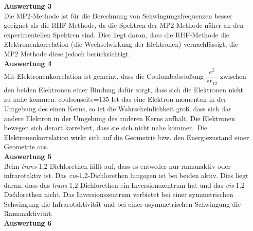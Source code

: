 \documentclass[12pt]{article}
\begin{document}
\begin{onehalfspace}
\textbf{Auswertung 3}\\
Die MP2-Methode ist für die Berechnung von Schwingungsfrequenzen besser geeignet als die RHF-Methode,
da die Spektren der MP2-Methode näher an den experimentellen Spektren sind.
Dies liegt daran, dass die RHF-Methode die Elektronenkorrelation (die Wechselwirkung der Elektronen) vernachlässigt,
die MP2 Methode diese jedoch berücksichtigt.\\
\textbf{Auswertung 4}\\
Mit Elektronenkorrelation ist gemeint, dass die Coulombabstoßung $\dfrac{e^2}{\epsilon r_{12}}$ zwischen den beiden Elektronen einer Bindung dafür sorgt, dass sich
die Elektronen nicht zu nahe kommen. coulsonseite=135 Ist das eine Elektron momentan in der Umgebung des einen Kerns,
so ist die Wahrscheinlichkeit groß, dass sich das andere Elektron in der Umgebung des anderen Kerns aufhält. Die Elektronen bewegen sich derart \glqq
korreliert\grqq, dass sie sich nicht nahe kommen. Die Elektronenkorrelation wirkt sich auf die Geometrie bzw. den
Energiezustand einer Geometrie aus.\\
\textbf{Auswertung 5}\\
Beim \textit{trans}-1,2-Dichlorethen fällt auf, dass es entweder nur ramanaktiv oder infrarotaktiv ist.
Das \textit{cis}-1,2-Dichlorethen hingegen
 ist bei beiden aktiv. Dies liegt daran, dass das \textit{trans}-1,2-Dichlorethen ein
  Inversionszentrum hat und das \textit{cis}-1,2-Dichlorethen nicht.
Das Inversionszentrum verbietet bei einer symmetrischen Schwingung die
Infrarotaktivität und bei einer asymmetrischen Schwingung die Ramanaktivität.\\
\textbf{Auswertung 6}\\


\end{onehalfspace}
\end{document}

